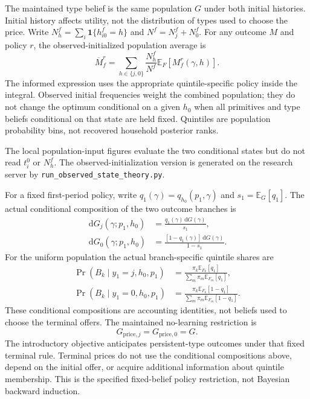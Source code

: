 \documentclass[11pt]{article}
\newcommand{\E}{\mathbb{E}}
\newcommand{\ind}{\mathbf{1}}
\newcommand{\dd}{\,\mathrm{d}}
\begin{document}
The maintained type belief is the same population $G$ under both initial
histories. Initial history affects utility, not the distribution of types
used to choose the price. Write $N_h^f=\sum_i\ind\{h_{i0}^f=h\}$ and
$N^f=N_j^f+N_0^f$. For any outcome $M$ and policy $r$, the observed-initialized
population average is
\begin{equation}
 \overline M_f^r=\sum_{h\in\{j,0\}}\frac{N_h^f}{N^f}
 \E_F[M_f^r(\gamma,h)].
\end{equation}
The informed expression uses the appropriate quintile-specific policy inside
the integral. Observed initial frequencies weight the combined population;
they do not change the optimum conditional on a given $h_0$ when all primitives
and type beliefs conditional on that state are held fixed. Quintiles are
population probability bins, not recovered household posterior ranks.

The local population-input figures evaluate the two conditional states but do
not read $t_i^0$ or $N_h^f$. The observed-initialization version is generated
on the research server by \texttt{run\_observed\_state\_theory.py}.

For a fixed first-period policy, write
$q_1(\gamma)=q_{h_0}(p_1,\gamma)$ and $s_1=\E_G[q_1]$.
The actual conditional composition of the two outcome branches is
\begin{align}
 \dd G_j(\gamma;p_1,h_0)&=\frac{q_1(\gamma)\dd G(\gamma)}{s_1},\\
 \dd G_0(\gamma;p_1,h_0)&=\frac{[1-q_1(\gamma)]\dd G(\gamma)}{1-s_1}.
\end{align}
For the uniform population the actual branch-specific quintile shares are
\begin{align}
 \Pr(B_k\mid y_1=j,h_0,p_1)
 &=\frac{\pi_k\E_{F_k}[q_1]}{\sum_m\pi_m\E_{F_m}[q_1]},\\
 \Pr(B_k\mid y_1=0,h_0,p_1)
 &=\frac{\pi_k\E_{F_k}[1-q_1]}{\sum_m\pi_m\E_{F_m}[1-q_1]}.
\end{align}
These conditional compositions are accounting identities, not beliefs used
to choose the terminal offers. The maintained no-learning restriction is
\begin{equation}
 G_{\mathrm{price},j}=G_{\mathrm{price},0}=G.
\end{equation}
The introductory objective anticipates persistent-type outcomes under that
fixed terminal rule. Terminal prices do not use the conditional compositions
above, depend on the initial offer, or acquire additional information about
quintile membership. This is the specified fixed-belief policy restriction,
not Bayesian backward induction.
\end{document}
